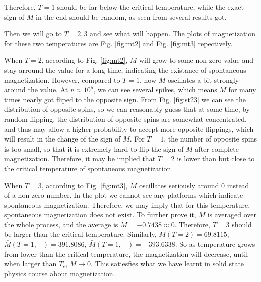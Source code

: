 \documentclass[12pt, graphicx]{article}
\begin{document}
Therefore, $T=1$ should be far below the critical temperature, while the exact sign of $M$ in the end should be random, as seen from several results got.\par
Then we will go to $T=2,3$ and see what will happen. The plots of magnetization for these two temperatures are Fig. \ref{fig:mt2} and Fig. \ref{fig:mt3} repectively.\par
When $T=2$, according to Fig. \ref{fig:mt2}, $M$ will grow to some non-zero value and stay arround the value for a long time, indicating the existance of spontaneous magnetization. However, compared to $T=1$, now $M$ oscillates a bit strongly around the value. At $n\approx10^5$, we can see several spikes, which means $M$ for many times nearly got fliped to the opposite sign. From Fig. \ref{fig:st23} we can see the distribution of opposite spins, so we can reasonably guess that at some time, by random flipping, the distribution of opposite spins are somewhat concentrated, and thus may allow a higher probability to accept more opposite flippings, which will result in the change of the sign of $M$. For $T=1$, the number of opposite spins is too small, so that it is extremely hard to flip the sign of $M$ after complete magnetization. Therefore, it may be implied that $T=2$ is lower than but close to the critical temperature of spontaneous magnetization.\par
When $T=3$, according to Fig. \ref{fig:mt3}, $M$ oscillates seriously around 0 instead of a non-zero number. In the plot we cannot see any platforms which indicate spontaneous magnetization. Therefore, we may imply that for this temperature, spontaneous magnetization does not exist. To further prove it, $M$ is averaged over the whole process, and the average is $\bar{M}=-0.7438\approx0$. Therefore, $T=3$ should be larger than the critical temperature. Similarly, $\bar{M}(T=2)=69.8115$, $\bar{M}(T=1,+)=391.8086$, $\bar{M}(T=1,-)=-393.6338$. So as temperature grows from lower than the critical temperature, the magnetization will decrease, until when larger than $T_c$, $M\to 0$. This satiesfies what we have learnt in solid state physics course about magnetization.\par
\end{document}
